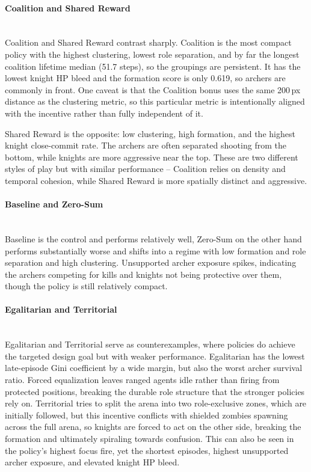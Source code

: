 \paragraph{Coalition and Shared Reward}\mbox{}\\
Coalition and Shared Reward contrast sharply. Coalition is the most compact policy with the highest clustering, lowest role separation, and by far the longest coalition lifetime median (51.7 steps), so the groupings are persistent. It has the lowest knight HP bleed and the formation score is only 0.619, so archers are commonly in front. One caveat is that the Coalition bonus uses the same 200\,px distance as the clustering metric, so this particular metric is intentionally aligned with the incentive rather than fully independent of it.

Shared Reward is the opposite: low clustering, high formation, and the highest knight close-commit rate. The archers are often separated shooting from the bottom, while knights are more aggressive near the top.
These are two different styles of play but with similar performance -- Coalition relies on density and temporal cohesion, while Shared Reward is more spatially distinct and aggressive.

\paragraph{Baseline and Zero-Sum}\mbox{}\\
Baseline is the control and performs relatively well, Zero-Sum on the other hand performs substantially worse and shifts into a regime with low formation and role separation and high clustering. Unsupported archer exposure spikes, indicating the archers competing for kills and knights not being protective over them, though the policy is still relatively compact.

\paragraph{Egalitarian and Territorial}\mbox{}\\
Egalitarian and Territorial serve as counterexamples, where policies do achieve the targeted design goal but with weaker performance. Egalitarian has the lowest late-episode Gini coefficient by a wide margin, but also the worst archer survival ratio. Forced equalization leaves ranged agents idle rather than firing from protected positions, breaking the durable role structure that the stronger policies rely on. 
Territorial tries to split the arena into two role-exclusive zones, which are initially followed, but this incentive conflicts with shielded zombies spawning across the full arena, so knights are forced to act on the other side, breaking the formation and ultimately spiraling towards confusion. This can also be seen in the policy's highest focus fire, yet the shortest episodes, highest unsupported archer exposure, and elevated knight HP bleed.

